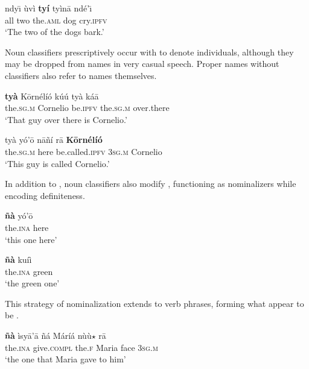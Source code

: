 \documentclass[output=paper,modfonts,nonflat]{langsci/langscibook}
\begin{document}
\ea {}\label{ex:cisneros:50}
\gll
{\ob}ndy\=\i{} \`uv\`i \textbf{ty\'i} ty\`in\=a{\cb} nd\'e'\=\i\\
{\db}all two the.\textsc{aml} dog cry.\textsc{ipfv}\\
\glt
`The two of the dogs bark.'
\z 

Noun classifiers prescriptively occur with  to denote individuals, although they may be dropped from names in very casual speech.  Proper names without classifiers also refer to names themselves.

\ea {}\label{ex:cisneros:51}
\gll
{\ob}{\op}\textbf{ty\`a}{\cp} K\=orn\'el\'i\'o{\cb} k\'u\'u {\ob}ty\`a k\'a\=a{\cb}\\
\phantom{[(}the.\textsc{sg.m} Cornelio be.\textsc{ipfv} {\db}the.\textsc{sg.m} over.there\\
\glt
`That guy over there is Cornelio.'
\z 

\ea {}\label{ex:cisneros:52}
\gll
{\ob}ty\`a y\'o'\=o{\cb} n\=a\~n\'i r\=a \textbf{K\=orn\'el\'i\'o}\\
{\db}the.\textsc{sg.m} here be.called.\textsc{ipfv} 3\textsc{sg.m} Cornelio\\
\glt
`This guy is called Cornelio.'
\z 

In addition to , noun classifiers also modify , functioning as nominalizers while encoding definiteness.  

\ea {}\label{ex:cisneros:53}
\gll
\textbf{\~n\`a} y\'o'\=o\\
the.\textsc{ina} here\\
\glt
`this one here'
\z 

\ea {}\label{ex:cisneros:54}
\gll
\textbf{\~n\`a} ku\'i\`i\\
the.\textsc{ina} green\\
\glt
`the green one'
\z 

This strategy of nominalization extends to verb phrases, forming what appear to be .

\begin{exe}
\ex \label{ex:cisneros:55}
\gll
\textbf{\~n\`a} \`isy\=a'\=a {\ob}\~n\'a M\'ar\'i\'a{\cb} {\ob}n\`u\`u$\star$ r\=a{\cb}\\
the.\textsc{ina} give.\textsc{compl} {\db}the.\textsc{f} Maria {\db}face 3\textsc{sg.m}\\
\glt
`the one that Maria gave to him'
\end{exe}
\end{document}
